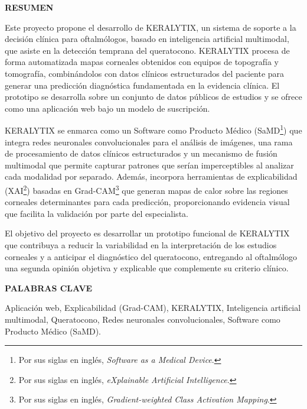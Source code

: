\newpage
\thispagestyle{empty}

\begin{center}
    \Large \textbf{RESUMEN}
\end{center}

    Este proyecto propone el desarrollo de KERALYTIX, un sistema de soporte a la decisión clínica para oftalmólogos, basado en inteligencia artificial multimodal, que asiste en la detección temprana del queratocono. KERALYTIX procesa de forma automatizada mapas corneales obtenidos con equipos de topografía y tomografía, combinándolos con datos clínicos estructurados del paciente para generar una predicción diagnóstica fundamentada en la evidencia clínica. El prototipo se desarrolla sobre un conjunto de datos públicos de estudios \Orbscan{} y se ofrece como una aplicación web bajo un modelo de suscripción.

    KERALYTIX se enmarca como un Software como Producto Médico (SaMD\footnote{Por sus siglas en inglés, \textit{Software as a Medical Device}.}) que integra redes neuronales convolucionales para el análisis de imágenes, una rama de procesamiento de datos clínicos estructurados y un mecanismo de fusión multimodal que permite capturar patrones que serían imperceptibles al analizar cada modalidad por separado. Además, incorpora herramientas de explicabilidad (XAI\footnote{Por sus siglas en inglés, \textit{eXplainable Artificial Intelligence}.}) basadas en Grad-CAM\footnote{Por sus siglas en inglés, \textit{Gradient-weighted Class Activation Mapping}.} que generan mapas de calor sobre las regiones corneales determinantes para cada predicción, proporcionando evidencia visual que facilita la validación por parte del especialista.

    El objetivo del proyecto es desarrollar un prototipo funcional de KERALYTIX que contribuya a reducir la variabilidad en la interpretación de los estudios corneales y a anticipar el diagnóstico del queratocono, entregando al oftalmólogo una segunda opinión objetiva y explicable que complemente su criterio clínico.

\begin{center}
    \Large \textbf{PALABRAS CLAVE}
\end{center}

    Aplicación web, Explicabilidad (Grad-CAM), KERALYTIX, Inteligencia artificial multimodal, Queratocono, Redes neuronales convolucionales, Software como Producto Médico (SaMD).

\newpage


